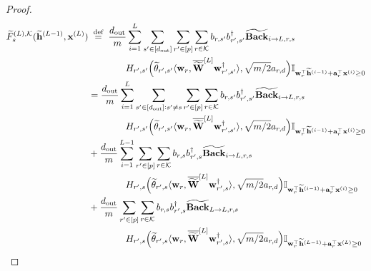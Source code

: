 \begin{claim}
\begin{proof}
				\iffalse
				\begingroup \allowdisplaybreaks
				\begin{align}
					\widetilde{F}_{s}^{(L), \mathcal{K}}(\widetilde{\mathbf{h}}^{(L-1)}, \mathbf{x}^{(L)}) &\stackrel{\text { def }}{=} \frac{d_{\mathrm{out}} }{m} \sum_{i=1}^{L}  \sum_{s' \in [d_{\mathrm{out}} ]} \sum_{r' \in [p]} \sum_{r \in \mathcal{K}}  b_{r, s'} b_{r', s'}^{\dagger} \widetilde{\mathbf{Back}}_{i \to L, r, s} \nonumber\\& \quad \quad \quad \quad H_{r', s'}\Big(\widetilde{\theta}_{r', s'} \langle \mathbf{w}_{r}, \overline{\widetilde{\mathbf{W}}}^{[L]} \mathbf{w}_{r', s'}^{\dagger}\rangle , \sqrt{m/2} a_{r, d}\Big) \mathbb{I}_{\mathbf{w}_r^{\top} \widetilde{\mathbf{h}}^{(i-1)} + \mathbf{a}_r^{\top} \mathbf{x}^{(i)} \ge 0} \nonumber
					\\&
					= \frac{d_{\mathrm{out}} }{m} \sum_{i=1}^{L}  \sum_{s' \in [d_{\mathrm{out}} ]: s' \ne s} \sum_{r' \in [p]} \sum_{r \in \mathcal{K}}  b_{r, s'} b_{r', s'}^{\dagger} \widetilde{\mathbf{Back}}_{i \to L, r, s} \nonumber\\& \quad \quad \quad \quad H_{r', s'}\Big(\widetilde{\theta}_{r', s'} \langle \mathbf{w}_{r}, \overline{\widetilde{\mathbf{W}}}^{[L]} \mathbf{w}_{r', s'}^{\dagger}\rangle , \sqrt{m/2} a_{r, d}\Big) \mathbb{I}_{\mathbf{w}_r^{\top} \widetilde{\mathbf{h}}^{(i-1)} + \mathbf{a}_r^{\top} \mathbf{x}^{(i)} \ge 0}\label{eq:sprimenes} \\&
					+ \frac{d_{\mathrm{out}} }{m} \sum_{i=1}^{L-1}  \sum_{r' \in [p]} \sum_{r \in \mathcal{K}}  b_{r, s} b_{r', s}^{\dagger} \widetilde{\mathbf{Back}}_{i \to L, r, s} \nonumber\\& \quad \quad \quad \quad H_{r', s}\Big(\widetilde{\theta}_{r', s} \langle \mathbf{w}_{r}, \overline{\widetilde{\mathbf{W}}}^{[L]} \mathbf{w}_{r', s}^{\dagger}\rangle , \sqrt{m/2} a_{r, d}\Big) \mathbb{I}_{\mathbf{w}_r^{\top} \widetilde{\mathbf{h}}^{(i-1)} + \mathbf{a}_r^{\top} \mathbf{x}^{(i)} \ge 0}\label{eq:sprimeesL-1} \\&
					+ \frac{d_{\mathrm{out}} }{m}   \sum_{r' \in [p]} \sum_{r \in \mathcal{K}}  b_{r, s} b_{r', s}^{\dagger} \widetilde{\mathbf{Back}}_{L \to L, r, s} \nonumber\\& \quad \quad \quad \quad H_{r', s}\Big(\widetilde{\theta}_{r', s} \langle \mathbf{w}_{r}, \overline{\widetilde{\mathbf{W}}}^{[L]} \mathbf{w}_{r', s}^{\dagger}\rangle , \sqrt{m/2} a_{r, d}\Big) \mathbb{I}_{\mathbf{w}_r^{\top} \widetilde{\mathbf{h}}^{(L-1)} + \mathbf{a}_r^{\top} \mathbf{x}^{(L)} \ge 0}\label{eq:sprimeesL}
				\end{align}
				\endgroup
				

\end{proof}
\end{claim}
